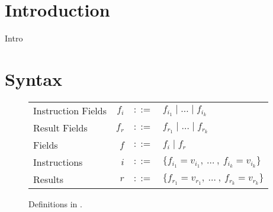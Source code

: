 \documentclass[sigconf,usenames,dvipsnames,svgnames,table]{acmart}
\begin{document}


\maketitle

\section{Introduction}
\sysname Intro
\cite{2011gem5sim}
\cite{2019stt}

\section {Syntax}
        
        \begin{figure}
          \centering
          \begin{tabular}{l r c l}
            Instruction Fields   & $f_{i}$   & $::=$ & $f_{i_{1}} \mid \dots \mid f_{i_{k}}$\\
            Result Fields   & $f_{r}$   & $::=$ & $f_{r_{1}} \mid \dots \mid f_{r_{k}}$\\
            Fields          & $f$       & $::=$ & $f_i \mid f_r$ \\
            Instructions    & $i$       & $::=$ & $\{f_{i_{1}} = v_{i_{1}} ,\ \dots\ ,\ f_{i_{k}} = v_{i_{k}}\}$\\
            Results         & $r$       & $::=$ & $\{f_{r_{1}} = v_{r_{1}} ,\ \dots\ ,\ f_{r_{k}} = v_{r_{k}}\}$
          \end{tabular}
          \caption{Definitions in \oldname.}
          \label{fig:garuda:defn}
        \end{figure}
        
\end{document}
